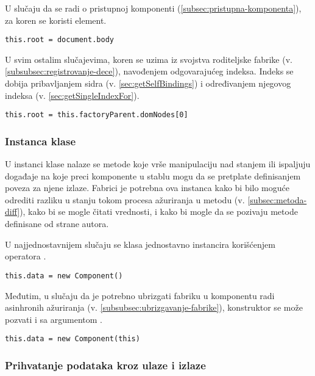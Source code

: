 U slučaju da se radi o pristupnoj komponenti (\cref{subsec:pristupna-komponenta}), za koren se koristi  element.

\begin{lstlisting}
this.root = document.body
\end{lstlisting}

U svim ostalim slučajevima, koren se uzima iz svojstva  roditeljske fabrike (v. \cref{subsubsec:registrovanje-dece}), navođenjem odgovarajućeg indeksa.
Indeks se dobija pribavljanjem sidra (v. \cref{sec:getSelfBindings}) i određivanjem njegovog indeksa (v. \cref{sec:getSingleIndexFor}).

\begin{lstlisting}
this.root = this.factoryParent.domNodes[0]
\end{lstlisting}

\subsubsection{Instanca klase}

U instanci klase nalaze se metode koje vrše manipulaciju nad stanjem ili ispaljuju događaje na koje preci komponente u stablu mogu da se pretplate definisanjem poveza za njene izlaze.
Fabrici je potrebna ova instanca kako bi bilo moguće odrediti razliku u stanju tokom procesa ažuriranja u metodu  (v. \cref{subsec:metoda-diff}), kako bi se mogle čitati vrednosti, i kako bi mogle da se pozivaju metode definisane od strane autora.

U najjednostavnijem slučaju se klasa jednostavno instancira korišćenjem operatora .

\begin{lstlisting}
this.data = new Component()
\end{lstlisting}

Međutim, u slučaju da je potrebno ubrizgati fabriku u komponentu radi asinhronih ažuriranja (v. \cref{subsubsec:ubrizgavanje-fabrike}), konstruktor se može pozvati i sa argumentom .

\begin{lstlisting}
this.data = new Component(this)
\end{lstlisting}

\subsubsection{Prihvatanje podataka kroz ulaze i izlaze}

